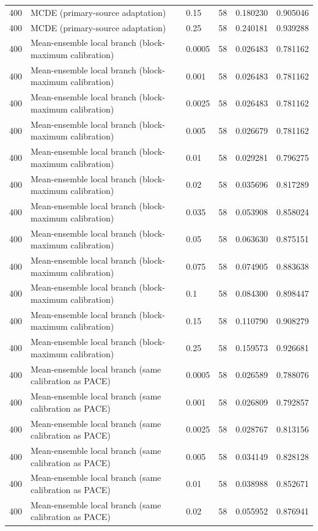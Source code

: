 \begin{tabular}{llllll}
400 & MCDE (primary-source adaptation) & 0.15 & 58 & 0.180230 & 0.905046 \\
400 & MCDE (primary-source adaptation) & 0.25 & 58 & 0.240181 & 0.939288 \\
400 & Mean-ensemble local branch (block-maximum calibration) & 0.0005 & 58 & 0.026483 & 0.781162 \\
400 & Mean-ensemble local branch (block-maximum calibration) & 0.001 & 58 & 0.026483 & 0.781162 \\
400 & Mean-ensemble local branch (block-maximum calibration) & 0.0025 & 58 & 0.026483 & 0.781162 \\
400 & Mean-ensemble local branch (block-maximum calibration) & 0.005 & 58 & 0.026679 & 0.781162 \\
400 & Mean-ensemble local branch (block-maximum calibration) & 0.01 & 58 & 0.029281 & 0.796275 \\
400 & Mean-ensemble local branch (block-maximum calibration) & 0.02 & 58 & 0.035696 & 0.817289 \\
400 & Mean-ensemble local branch (block-maximum calibration) & 0.035 & 58 & 0.053908 & 0.858024 \\
400 & Mean-ensemble local branch (block-maximum calibration) & 0.05 & 58 & 0.063630 & 0.875151 \\
400 & Mean-ensemble local branch (block-maximum calibration) & 0.075 & 58 & 0.074905 & 0.883638 \\
400 & Mean-ensemble local branch (block-maximum calibration) & 0.1 & 58 & 0.084300 & 0.898447 \\
400 & Mean-ensemble local branch (block-maximum calibration) & 0.15 & 58 & 0.110790 & 0.908279 \\
400 & Mean-ensemble local branch (block-maximum calibration) & 0.25 & 58 & 0.159573 & 0.926681 \\
400 & Mean-ensemble local branch (same calibration as PACE) & 0.0005 & 58 & 0.026589 & 0.788076 \\
400 & Mean-ensemble local branch (same calibration as PACE) & 0.001 & 58 & 0.026809 & 0.792857 \\
400 & Mean-ensemble local branch (same calibration as PACE) & 0.0025 & 58 & 0.028767 & 0.813156 \\
400 & Mean-ensemble local branch (same calibration as PACE) & 0.005 & 58 & 0.034149 & 0.828128 \\
400 & Mean-ensemble local branch (same calibration as PACE) & 0.01 & 58 & 0.038988 & 0.852671 \\
400 & Mean-ensemble local branch (same calibration as PACE) & 0.02 & 58 & 0.055952 & 0.876941 \\

\end{tabular}
